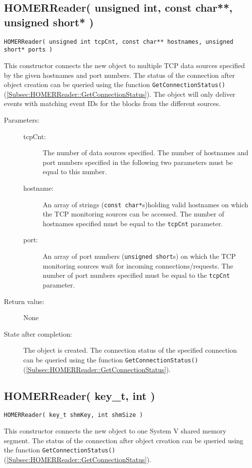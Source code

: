 \documentclass[a4paper,twoside]{article}
\begin{document}
\subsection{HOMERReader( unsigned int, const char**, unsigned short* )}

\texttt{HOMERReader( unsigned int tcpCnt, const char** hostnames, unsigned short* ports )}

This constructor connects the new object to multiple TCP data sources specified by the given hostnames and port numbers. The status of the connection after object creation can be queried
using the function \texttt{GetConnectionStatus()} (\ref{Subsec:HOMERReader::GetConnectionStatus}). The object will only deliver events with matching event IDs for the blocks from the 
different sources. 

\begin{description}
\item[Parameters:]
	\begin{description}
	\item[tcpCnt:] The number of data sources specified. The number of hostnames and port numbers specified in the following
	two parameters must be equal to this number.
	\item[hostname:] An array of strings (\texttt{const char*}s)holding valid hostnames on which the TCP monitoring sources can be accessed. The number of hostnames
	specified must be equal to the \texttt{tcpCnt} parameter. 
	\item[port:] An array of port numbers (\texttt{unsigned short}s) on which the TCP monitoring sources wait for incoming connections/requests. The number of port numbers
	specified must be equal to the \texttt{tcpCnt} parameter. 
	\end{description}
\item[Return value:] None
\item[State after completion:] The object is created. The connection status of the specified connection can be queried
using the function \texttt{GetConnectionStatus()} (\ref{Subsec:HOMERReader::GetConnectionStatus}). 
\end{description}


\subsection{HOMERReader( key\_t, int )}

\texttt{HOMERReader( key\_t shmKey, int shmSize )}

This constructor connects the new object to one System V shared memory segment. The status of the connection after object creation can be queried
using the function \texttt{GetConnectionStatus()} (\ref{Subsec:HOMERReader::GetConnectionStatus}).
\end{document}
